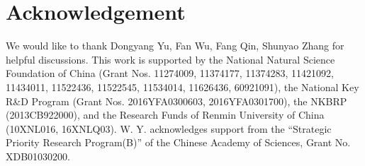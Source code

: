 \documentclass[a4paper, aps,pra, twocolumn, superscriptaddress, showpacs]{revtex4}
\begin{document}
\section*{Acknowledgement}
We would like to thank Dongyang Yu, Fan Wu, Fang Qin, Shunyao Zhang for helpful discussions. This work is supported by the National Natural Science Foundation of China (Grant Nos. 11274009, 11374177, 11374283, 11421092, 11434011, 11522436, 11522545, 11534014, 11626436, 60921091), the National Key R\&D Program (Grant Nos. 2016YFA0300603, 2016YFA0301700), the NKBRP (2013CB922000), and the Research Funds of Renmin University of China (10XNL016, 16XNLQ03). W. Y. acknowledges support from the ``Strategic Priority Research Program(B)'' of the Chinese Academy of Sciences, Grant No. XDB01030200.




\end{document}
